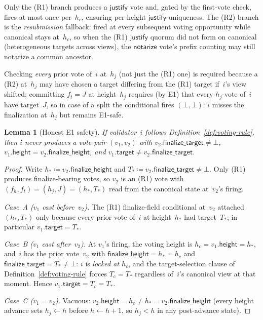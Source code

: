 \ifx\litemode\undefined\documentclass{article}\fi
\newcommand{\target}{\mathsf{target}}
\newcommand{\height}{\mathsf{height}}
\newcommand{\just}{\ensuremath{\mathsf{justify}}\xspace}
\newcommand{\notar}{\ensuremath{\mathsf{notarize}}\xspace}
\newcommand{\finalizeHeight}{\mathsf{finalize\_height}}
\newcommand{\finalizeTarget}{\mathsf{finalize\_target}}
\theoremstyle{plain}
\newtheorem{lemma}{Lemma}
\theoremstyle{definition}
\theoremstyle{remark}
\begin{document}
Only the (R1) branch produces a \just vote and, gated by the first-vote check, fires at most once per~$h_c$, ensuring per-height \just-uniqueness.
The (R2) branch is the \emph{resubmission} fallback: fired at every subsequent voting opportunity while canonical stays at~$h_c$, so when the (R1) \just quorum did not form on canonical (heterogeneous targets across views), the \notar vote's prefix counting may still notarize a common ancestor.

Checking \emph{every} prior vote of~$i$ at~$h_j$ (not just the (R1) one) is required because a (R2) at~$h_j$ may have chosen a target differing from the (R1) target if~$i$'s view shifted; committing $f_t = J$ at height~$h_j$ requires (by E1) that every $h_j$-vote of~$i$ have target~$J$, so in case of a split the conditional fires $(\bot, \bot)$: $i$ misses the finalization at~$h_j$ but remains E1-safe.

\begin{lemma}[Honest E1 safety]\label{lem:honest-e1-safety}
If validator~$i$ follows Definition~\ref{def:voting-rule}, then $i$ never produces a vote-pair $(v_1, v_2)$ with $v_2.\finalizeTarget \neq \bot$, $v_1.\height = v_2.\finalizeHeight$, and $v_1.\target \neq v_2.\finalizeTarget$.
\end{lemma}

\begin{proof}
Write $h_\ast \coloneqq v_2.\finalizeHeight$ and $T_\ast \coloneqq v_2.\finalizeTarget \neq \bot$.
Only (R1) produces finalize-bearing votes, so $v_2$ is an (R1) vote with $(f_h, f_t) = (h_j, J) = (h_\ast, T_\ast)$ read from the canonical state at~$v_2$'s firing.

\emph{Case~A ($v_1$ cast before~$v_2$).}
The (R1) finalize-field conditional at~$v_2$ attached $(h_\ast, T_\ast)$ only because every prior vote of~$i$ at height~$h_\ast$ had target~$T_\ast$; in particular $v_1.\target = T_\ast$.

\emph{Case~B ($v_1$ cast after~$v_2$).}
At $v_1$'s firing, the voting height is $h_c = v_1.\height = h_\ast$, and~$i$ has the prior vote~$v_2$ with $\finalizeHeight = h_\ast = h_c$ and $\finalizeTarget = T_\ast \neq \bot$: $i$ is \emph{locked at $h_c$}, and the target-selection clause of Definition~\ref{def:voting-rule} forces $T_c = T_\ast$ regardless of~$i$'s canonical view at that moment.
Hence $v_1.\target = T_c = T_\ast$.

\emph{Case~C ($v_1 = v_2$).}
Vacuous: $v_2.\height = h_c \neq h_\ast = v_2.\finalizeHeight$ (every height advance sets $h_j \gets h$ before $h \gets h + 1$, so $h_j < h$ in any post-advance state).
\end{proof}
\end{document}
